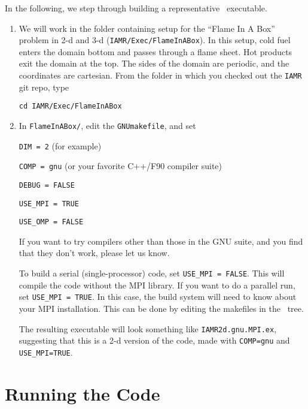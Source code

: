 In the following, we step through building a representative \iamr\ executable.
\begin{enumerate}
\item We will work in the folder containing setup for the ``Flame In A Box'' problem in 2-d and 3-d
({\tt IAMR/Exec/FlameInABox}).
In this setup, cold fuel enters the domain bottom and passes through a flame sheet.
Hot products exit the domain at the top.  The sides of the domain are periodic, and the coordinates are
cartesian. From the folder in which you checked out the {\tt IAMR} git repo,
  type
\begin{verbatim}
cd IAMR/Exec/FlameInABox
\end{verbatim}

\item In {\tt FlameInABox/}, edit the {\tt GNUmakefile}, and set

{\tt DIM = 2} (for example)

{\tt COMP = gnu} (or your favorite C++/F90 compiler suite)

{\tt DEBUG = FALSE}

{\tt USE\_MPI = TRUE}

{\tt USE\_OMP = FALSE}

If you want to try compilers other than those in the GNU suite, and you find that they don't
work, please let us know.

To build a serial (single-processor) code, set {\tt USE\_MPI = FALSE}.
This will compile the code without the MPI library.  If you want to do
a parallel run, set {\tt USE\_MPI = TRUE}.  In this
case, the build system will need to know about your MPI installation.
This can be done by editing the makefiles in the \amrex\ tree.

The resulting executable will look something like {\tt IAMR2d.gnu.MPI.ex},
suggesting that this is a 2-d version of the code, made with 
{\tt COMP=gnu} and {\tt USE\_MPI=TRUE}.

\end{enumerate}

\section{Running the Code}

